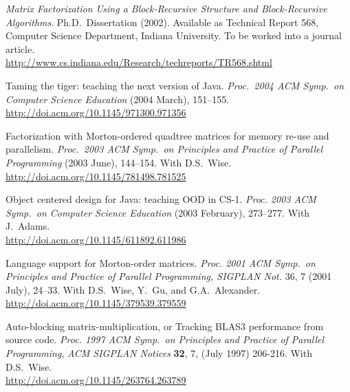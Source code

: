 \documentclass[ComputerScience]{vita}
\newcommand{\duphref}[1]{\href{#1}{#1}}
\begin{document}
\begin{vita}
\begin{Publications}
  \item \textit{Matrix Factorization Using a Block-Recursive Structure and Block-Recursive Algorithms}.  Ph.D.\ Dissertation (2002).  Available as Technical Report 568, Computer Science Department, Indiana University.  To be worked into a journal article.  \\\duphref{http://www.cs.indiana.edu/Research/techreports/TR568.shtml}

  \begin{Papers at Refereed Conferences}
	
	\item Taming the tiger: teaching the next version of Java.  \textit{Proc.\ 2004 ACM Symp.\ on Computer Science Education} (2004 March), 151--155.  \\\duphref{http://doi.acm.org/10.1145/971300.971356}

  \item Factorization with Morton-ordered quadtree matrices for memory re-use and parallelism. \textit{Proc.\ 2003 ACM Symp.\ on Principles and Practice of Parallel Programming} (2003 June), 144--154.  With D.S.\ Wise.  \\\duphref{http://doi.acm.org/10.1145/781498.781525}

  \item Object centered design for Java: teaching OOD in CS-1. \textit{Proc. 2003 ACM Symp.\ on Computer Science Education} (2003 February), 273--277.  With J.\ Adams.  \\\duphref{http://doi.acm.org/10.1145/611892.611986}

  \item Language support for Morton-order matrices. \textit{Proc. 2001 ACM Symp.\ on Principles and Practice of Parallel Programming, SIGPLAN Not.} 36, 7 (2001 July), 24--33.  With D.S.\ Wise, Y.\ Gu, and G.A.\ Alexander.  \\\duphref{http://doi.acm.org/10.1145/379539.379559}

  \item Auto-blocking matrix-multiplication, or Tracking BLAS3 performance from source code. \textit{Proc. 1997 ACM Symp.\ on Principles and Practice of Parallel Programming\nocorr}, \textit{ACM SIGPLAN Notices} \textbf{32}, 7, (July 1997) 206-216.  With D.S.~Wise. \\\duphref{http://doi.acm.org/10.1145/263764.263789}

  \end{Papers at Refereed Conferences}

  \begin{Technical Reports}


\end{Technical Reports}
\end{Publications}
\end{vita}
\end{document}
